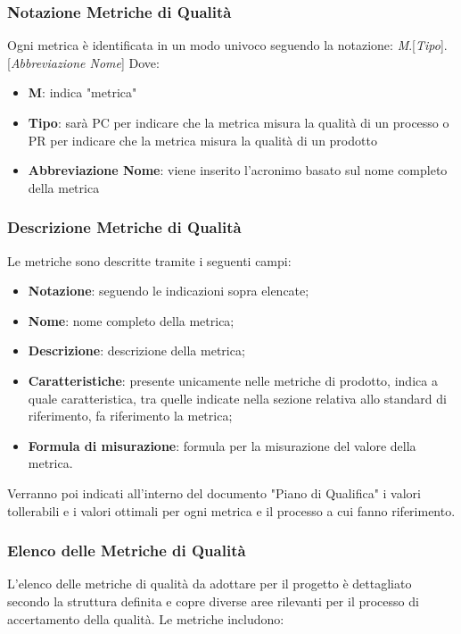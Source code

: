 \subsubsection{Notazione Metriche di Qualità}
Ogni metrica è identificata in un modo univoco seguendo la notazione: \textit{M}.[\textit{Tipo}].[\textit{Abbreviazione Nome}]
Dove:
\begin{itemize}
    \item \textbf{M}: indica "metrica"
    \item \textbf{Tipo}: sarà PC per indicare che la metrica misura la qualità di un processo o PR per indicare che la metrica misura la qualità di un prodotto
    \item \textbf{Abbreviazione Nome}: viene inserito l'acronimo basato sul nome completo della metrica
\end{itemize}
\subsubsection{Descrizione Metriche di Qualità}
Le metriche sono descritte tramite i seguenti campi:
\begin{itemize}
    \item \textbf{Notazione}: seguendo le indicazioni sopra elencate;
    \item \textbf{Nome}: nome completo della metrica;
    \item \textbf{Descrizione}: descrizione della metrica;
    \item \textbf{Caratteristiche}: presente unicamente nelle metriche di prodotto, indica a quale caratteristica, tra quelle indicate nella sezione relativa allo standard di riferimento, fa riferimento la metrica;
    \item \textbf{Formula di misurazione}: formula per la misurazione del valore della metrica.
\end{itemize}
Verranno poi indicati all'interno del documento "Piano di Qualifica" i valori tollerabili e i valori ottimali per ogni metrica e il processo a cui fanno riferimento.
\subsubsection{Elenco delle Metriche di Qualità} 
L'elenco delle metriche di qualità da adottare per il progetto è dettagliato secondo la struttura definita e copre diverse aree rilevanti per il processo di accertamento della qualità. Le metriche includono:
